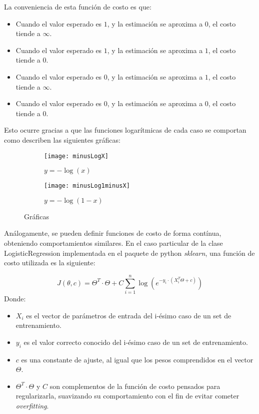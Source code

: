 La conveniencia de esta función de costo es que:

\begin{itemize}
  \item Cuando el valor esperado es $1$, y la estimación se aproxima a $0$, el costo tiende a $\infty$.
  \item Cuando el valor esperado es $1$, y la estimación se aproxima a $1$, el costo tiende a $0$.
  \item Cuando el valor esperado es $0$, y la estimación se aproxima a $1$, el costo tiende a $\infty$.
  \item Cuando el valor esperado es $0$, y la estimación se aproxima a $0$, el costo tiende a $0$.
\end{itemize}

Esto ocurre gracias a que las funciones logarítmicas de cada caso se comportan como describen las siguientes gráficas:

\begin{figure}[H]
\centering
\begin{subfigure}{.5\textwidth}
  \centering
  \texttt{[image: minusLogX]}
  \caption{$y = - \log (x)$}
  \label{fig:minusLogX}
\end{subfigure}%
\begin{subfigure}{.34\textwidth}
  \centering
  \texttt{[image: minusLog1minusX]}
  \caption{$y = - \log (1-x)$}
  \label{fig:minusLog1minusX}
\end{subfigure}
\caption{Gráficas}
\label{fig:minusLog}
\end{figure}

Análogamente, se pueden definir funciones de costo de forma contínua, obteniendo comportamientos similares. En el caso particular de la clase LogisticRegression implementada en el paquete de python \textit{sklearn}, una función de costo utilizada es la siguiente:

\begin{equation}
J(\theta,c)= \Theta^T \cdot \Theta + C \sum_{i=1}^n \log (e^{-y_{i} \cdot (X_{i}^T \Theta + c)})
\end{equation}
Donde:

\begin{itemize}
  \item $X_{i}$ es el vector de parámetros de entrada del i-ésimo caso de un set de entrenamiento.
  \item $y_{i}$ es el valor correcto conocido del i-ésimo caso de un set de entrenamiento.
  \item $c$ es una constante de ajuste, al igual que los pesos comprendidos en el vector $\Theta$.
  \item $\Theta^T \cdot \Theta$ y $C$ son complementos de la función de costo pensados para regularizarla, suavizando su comportamiento con el fin de evitar cometer \textit{overfitting}.
\end{itemize}

